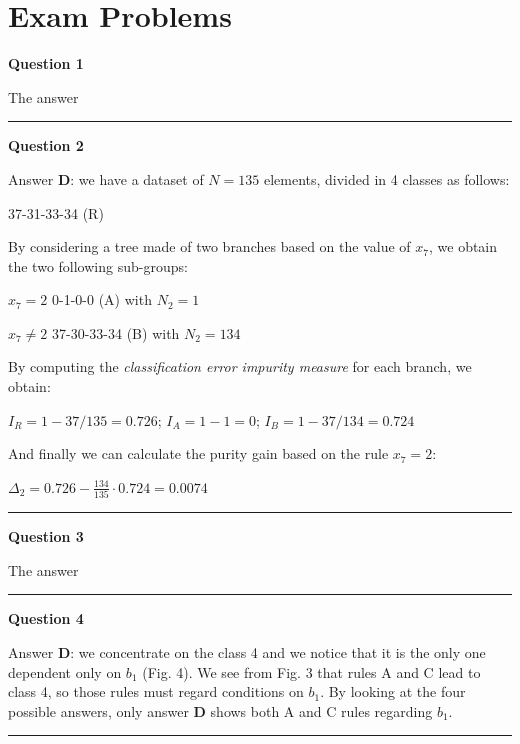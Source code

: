 \documentclass[
]{article}
\begin{document}
\newpage

\hypertarget{exam-problems}{%
\section{Exam Problems}\label{exam-problems}}

\textbf{Question 1}

The answer

\begin{center}\rule{0.5\linewidth}{0.5pt}\end{center}

\textbf{Question 2}

Answer \textbf{D}: we have a dataset of \(N=135\) elements, divided in 4
classes as follows:

37-31-33-34 (R)

By considering a tree made of two branches based on the value of
\(x_7\), we obtain the two following sub-groups:

\(x_7=2\) 0-1-0-0 (A) with \(N_2=1\)

\(x_7 \neq 2\) 37-30-33-34 (B) with \(N_2=134\)

By computing the \emph{classification error impurity measure} for each
branch, we obtain:

\(I_R=1-37/135=0.726\); \(I_A=1-1=0\); \(I_B=1-37/134=0.724\)

And finally we can calculate the purity gain based on the rule
\(x_7=2\):

\(\Delta_2=0.726-\frac{134}{135}\cdot 0.724=0.0074\)

\begin{center}\rule{0.5\linewidth}{0.5pt}\end{center}

\textbf{Question 3}

The answer

\begin{center}\rule{0.5\linewidth}{0.5pt}\end{center}

\textbf{Question 4}

Answer \textbf{D}: we concentrate on the class 4 and we notice that it
is the only one dependent only on \(b_1\) (Fig. 4). We see from Fig. 3
that rules A and C lead to class 4, so those rules must regard
conditions on \(b_1\). By looking at the four possible answers, only
answer \textbf{D} shows both A and C rules regarding \(b_1\).

\begin{center}\rule{0.5\linewidth}{0.5pt}\end{center}
\end{document}
